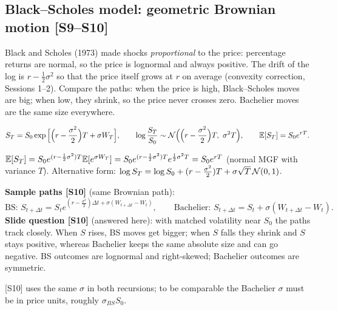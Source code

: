 \documentclass[10pt]{article}
\begin{document}
\subsection{Black--Scholes model: geometric Brownian motion [S9--S10]}
\begin{idea}
Black and Scholes (1973) made shocks \emph{proportional} to the price: percentage returns are normal, so the price is lognormal and always positive. The drift of the log is $r-\frac12\sigma^2$ so that the price itself grows at $r$ on average (convexity correction, Sessions 1--2). Compare the paths: when the price is high, Black--Scholes moves are big; when low, they shrink, so the price never crosses zero. Bachelier moves are the same size everywhere.
\end{idea}
\[S_T=S_0\exp\Big[\Big(r-\frac{\sigma^2}{2}\Big)T+\sigma W_T\Big],\qquad \log\frac{S_T}{S_0}\sim\N\Big(\Big(r-\frac{\sigma^2}2\Big)T,\ \sigma^2T\Big),\qquad \E[S_T]=S_0e^{rT}.\]
\begin{deriv}[{Verifying $\E[S_T]=S_0e^{rT}$ {[S9]}}]
$\mathbb{E}[S_T]=S_0e^{(r-\frac12\sigma^2)T}\mathbb{E}[e^{\sigma W_T}]=S_0e^{(r-\frac12\sigma^2)T}e^{\frac12\sigma^2T}=S_0e^{rT}$ (normal MGF with variance $T$). Alternative form: $\log S_T=\log S_0+(r-\frac{\sigma^2}{2})T+\sigma\sqrt T\,\mathcal{N}(0,1)$.
\end{deriv}
\textbf{Sample paths [S10]} (same Brownian path):
\[\text{BS: }S_{t+\Delta t}=S_te^{(r-\frac{\sigma^2}{2})\Delta t+\sigma(W_{t+\Delta t}-W_t)},\qquad\text{Bachelier: }S_{t+\Delta t}=S_t+\sigma(W_{t+\Delta t}-W_t).\]
\textbf{Slide question [S10]} (answered here): with matched volatility near $S_0$ the paths track closely. When $S$ rises, BS moves get bigger; when $S$ falls they shrink and $S$ stays positive, whereas Bachelier keeps the same absolute size and can go negative. BS outcomes are lognormal and right-skewed; Bachelier outcomes are symmetric.
\begin{exam}
\flag{} [S10] uses the same $\sigma$ in both recursions; to be comparable the Bachelier $\sigma$ must be in price units, roughly $\sigma_{BS}S_0$.
\end{exam}
\end{document}
